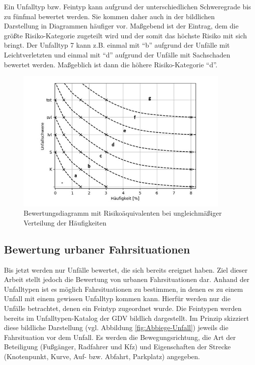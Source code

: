 Ein Unfalltyp bzw. Feintyp kann aufgrund der unterschiedlichen Schweregrade bis zu fünfmal bewertet werden. Sie kommen daher auch in der bildlichen Darstellung in Diagrammen häufiger vor. Maßgebend ist der Eintrag, dem die größte Risiko-Kategorie zugeteilt wird und der somit das höchste Risiko mit sich bringt. Der Unfalltyp 7 kann z.B. einmal mit \enquote{b} aufgrund der Unfälle mit Leichtverletzten und einmal mit \enquote{d} aufgrund der Unfälle mit Sachschaden bewertet werden. Maßgeblich ist dann die höhere Risiko-Kategorie \enquote{d}.

\begin{savenotes}
	\begin{figure}[H]
		\centering
		\includegraphics[width=10.5cm,height=7cm]{figures/Bewertungsdiagramm(2)}
		\caption[Bewertungsdiagramm mit Risikoäquivalenten bei ungleichmäßiger Verteilung der Häufigkeiten]{Bewertungsdiagramm mit Risikoäquivalenten bei ungleichmäßiger Verteilung der Häufigkeiten}\label{fig:Bewertungsdiagramm(2)}
	\end{figure}
\end{savenotes}

\subsection{Bewertung urbaner Fahrsituationen}\label{subsection:Bewertungs urbaner Fahrsituationen}
Bis jetzt werden nur Unfälle bewertet, die sich bereits ereignet haben. Ziel dieser Arbeit stellt jedoch die Bewertung von urbanen Fahrsituationen dar. Anhand der Unfalltypen ist es möglich Fahrsituationen zu bestimmen, in denen es zu einem Unfall mit einem gewissen Unfalltyp kommen kann. Hierfür werden nur die Unfälle betrachtet, denen ein Feintyp zugeordnet wurde. Die Feintypen werden bereits im Unfalltypen-Katalog der GDV bildlich dargestellt. Im Prinzip skizziert diese bildliche Darstellung (vgl. Abbildung \ref{fig:Abbiege-Unfall}) jeweils die Fahrsituation vor dem Unfall. Es werden die Bewegungsrichtung, die Art der Beteiligung (Fußgänger, Radfahrer und Kfz) und Eigenschaften der Strecke (Knotenpunkt, Kurve, Auf- bzw. Abfahrt, Parkplatz) angegeben.

